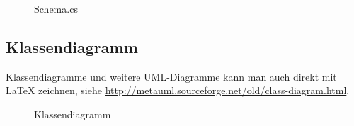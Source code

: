 \label{app:SchemaSrc}
\begin{figure}[htb]
\centering
{}
\caption{Schema.cs}
\end{figure}
\clearpage


\subsection{Klassendiagramm}
\label{app:Klassendiagramm}
Klassendiagramme und weitere \acs{UML}-Diagramme kann man auch direkt mit \LaTeX{} zeichnen, siehe \zB \url{http://metauml.sourceforge.net/old/class-diagram.html}.
\begin{figure}[htb]
\centering
{}
\caption{Klassendiagramm}
\end{figure}
\clearpage


